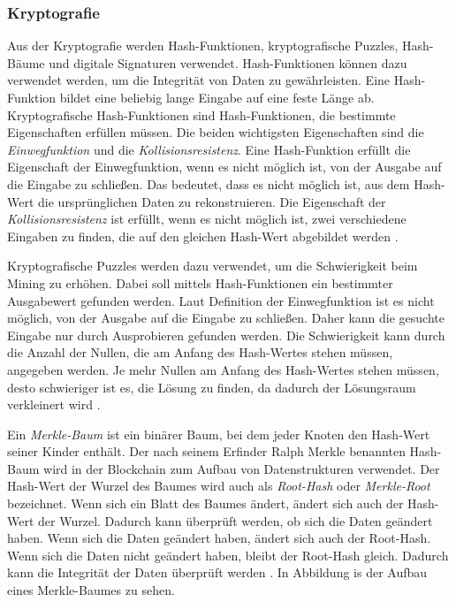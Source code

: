 \subsubsection{Kryptografie}
Aus der Kryptografie werden Hash-Funktionen, kryptografische Puzzles, Hash-Bäume und digitale Signaturen verwendet. Hash-Funktionen können dazu verwendet werden, um die Integrität von Daten zu gewährleisten. Eine Hash-Funktion bildet eine beliebig lange Eingabe auf eine feste Länge ab. Kryptografische Hash-Funktionen sind Hash-Funktionen, die bestimmte Eigenschaften erfüllen müssen. Die beiden wichtigsten Eigenschaften sind die \textit{Einwegfunktion} und die \textit{Kollisionsresistenz}. Eine Hash-Funktion erfüllt die Eigenschaft der Einwegfunktion, wenn es nicht möglich ist, von der Ausgabe auf die Eingabe zu schließen. Das bedeutet, dass es nicht möglich ist, aus dem Hash-Wert die ursprünglichen Daten zu rekonstruieren. Die Eigenschaft der \textit{Kollisionsresistenz} ist erfüllt, wenn es nicht möglich ist, zwei verschiedene Eingaben zu finden, die auf den gleichen Hash-Wert abgebildet werden \parencites[S. 12-13]{Brünnler_BlockchainKurzGut}[S. 6]{Fill_BlockchainGrundlagen}.

Kryptografische Puzzles werden dazu verwendet, um die Schwierigkeit beim Mining zu erhöhen. Dabei soll mittels Hash-Funktionen ein bestimmter Ausgabewert gefunden werden. Laut Definition der Einwegfunktion ist es nicht möglich, von der Ausgabe auf die Eingabe zu schließen. Daher kann die gesuchte Eingabe nur durch Ausprobieren gefunden werden. Die Schwierigkeit kann durch die Anzahl der Nullen, die am Anfang des Hash-Wertes stehen müssen, angegeben werden. Je mehr Nullen am Anfang des Hash-Wertes stehen müssen, desto schwieriger ist es, die Lösung zu finden, da dadurch der Lösungsraum verkleinert wird \parencite[S. 6-7]{Fill_BlockchainGrundlagen}.

Ein \textit{Merkle-Baum} ist ein binärer Baum, bei dem jeder Knoten den Hash-Wert seiner Kinder enthält. Der nach seinem Erfinder Ralph Merkle benannten Hash-Baum wird in der Blockchain zum Aufbau von Datenstrukturen verwendet. Der Hash-Wert der Wurzel des Baumes wird auch als \textit{Root-Hash} oder \textit{Merkle-Root} bezeichnet. Wenn sich ein Blatt des Baumes ändert, ändert sich auch der Hash-Wert der Wurzel. Dadurch kann überprüft werden, ob sich die Daten geändert haben. Wenn sich die Daten geändert haben, ändert sich auch der Root-Hash. Wenn sich die Daten nicht geändert haben, bleibt der Root-Hash gleich. Dadurch kann die Integrität der Daten überprüft werden \parencite[S. 7-8]{Fill_BlockchainGrundlagen}. In Abbildung is der Aufbau eines Merkle-Baumes zu sehen.

